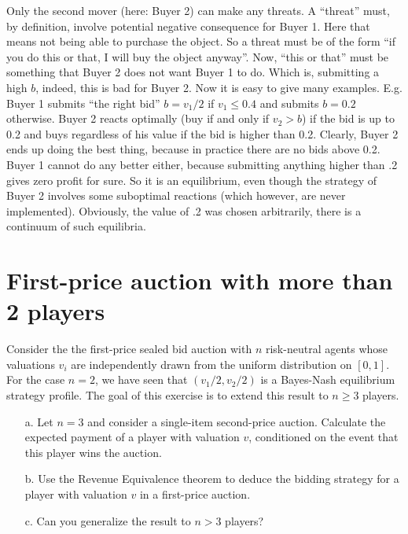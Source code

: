 \documentclass{../ape}
\begin{document}
\begin{solution}
\begin{enumerate}
Only the second mover (here: Buyer 2) can make any threats. A ``threat'' must, by definition, involve potential negative consequence for Buyer 1. Here that means not being able to purchase the object. So a threat
must be of the form ``if you do this or that, I will buy the object anyway''. Now, ``this or that'' must be something that Buyer 2 does not want Buyer 1 to do. Which is, submitting a high $b$, indeed, this is bad for Buyer 2. Now it is easy to give many examples. E.g. Buyer 1 submits ``the right bid'' $b = v_1/2$
if $v_1 \leq 0.4$ and submits $b = 0.2$ otherwise. Buyer 2 reacts optimally (buy if and only if $v_2 > b$) if the bid is up to 0.2 and buys regardless of his value if the bid is higher than 0.2. Clearly, Buyer 2 ends up doing the best thing, because in practice there are no bids above 0.2. Buyer 1 cannot do any better either, because submitting anything higher than .2 gives zero profit for sure. So it is an equilibrium, even though the strategy of Buyer 2 involves some suboptimal reactions (which however, are never implemented). Obviously, the value of .2 was chosen arbitrarily, there is a continuum of such equilibria.
\end{enumerate}
\end{solution}

\section{First-price auction with more than 2 players}

Consider the the first-price sealed bid auction with $n$ risk-neutral agents whose valuations $v_i$ are independently drawn from the uniform distribution on $[0,1]$. For the case $n=2$, we have seen that $(v_1/2,v_2/2)$ is a Bayes-Nash equilibrium strategy profile. The goal of this exercise is to extend this result to $n \geq 3$ players.
\begin{enumerate}
  \item[a.] Let $n=3$ and consider a single-item second-price auction. Calculate the expected payment of a player with valuation $v$, conditioned on the event that this player wins the auction.
  \item[b.] Use the Revenue Equivalence theorem to deduce the bidding strategy for a player with valuation $v$ in a first-price auction.
  \item[c.] Can you generalize the result to $n > 3$ players?
\end{enumerate}
\end{document}
